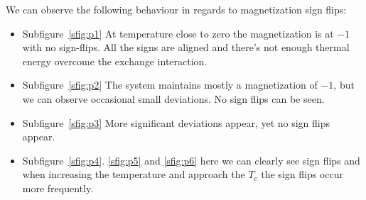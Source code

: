 We can observe the following behaviour in regards to magnetization sign flips:
\begin{itemize}
	\item Subfigure~\ref{sfig:p1} At temperature close to zero the magnetization is at $-1$ with no sign-flips. All the signs are aligned and there's not enough thermal energy overcome the exchange interaction.
	\item Subfigure~\ref{sfig:p2} The system maintains mostly a magnetization of $-1$, but we can observe occasional small deviations. No sign flips can be seen.
	\item Subfigure~\ref{sfig:p3} More significant deviations appear, yet no sign flips appear. 
	\item Subfigure~\ref{sfig:p4}. \ref{sfig:p5} and \ref{sfig:p6} here we can clearly see sign flips and when increasing the temperature and approach the $T_c$ the sign flips occur more frequently.
\end{itemize}

